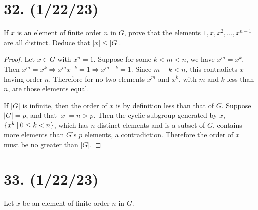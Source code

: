 \documentclass{article}
\begin{document}
\section*{32. (1/22/23)}

If $x$ is an element of finite order $n$ in $G$, prove that the elements $1, x, x^2, ..., x^{n - 1}$ are all distinct. Deduce that $|x| \leq |G|$.

\begin{proof}
      Let $x \in G$ with $x^n = 1$. Suppose for some $k < m < n$, we have $x^m = x^k$. Then $x^m = x^k \Rightarrow x^m x^{-k} = 1 \Rightarrow x^{m - k} = 1$. Since $m - k < n$, this contradicts $x$ having order $n$. Therefore for no two elements $x^m$ and $x^k$, with $m$ and $k$ less than $n$, are those elements equal.

      If $|G|$ is infinite, then the order of $x$ is by definition less than that of $G$. Suppose $|G| = p$, and that $|x| = n > p$. Then the cyclic subgroup generated by $x$, $\{x^k\hspace{0.5ex}|\hspace{0.5ex}0 \leq k < n\}$, which has $n$ distinct elements and is a subset of $G$, contains more elements than $G$'s $p$ elements, a contradiction. Therefore the order of $x$ must be no greater than $|G|$.
\end{proof}

\section*{33. (1/22/23)}

Let $x$ be an element of finite order $n$ in $G$.
\end{document}
